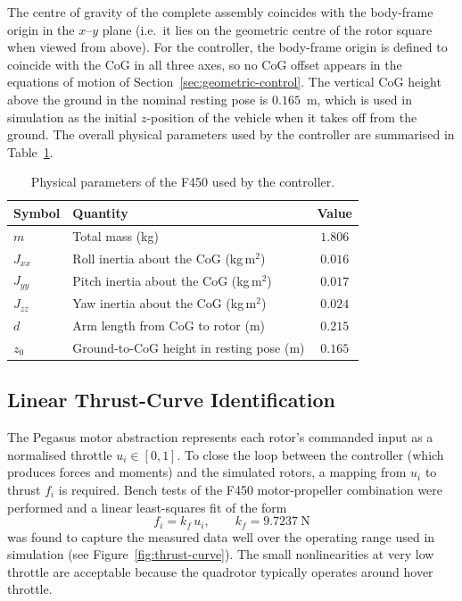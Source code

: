 \documentclass[11pt]{article}
\theoremstyle{remark}
\begin{document}
The centre of gravity of the complete assembly coincides with the body-frame origin in the $x$--$y$ plane (i.e.\ it lies on the geometric centre of the rotor square when viewed from above). For the controller, the body-frame origin is defined to coincide with the CoG in all three axes, so no CoG offset appears in the equations of motion of Section~\ref{sec:geometric-control}. The vertical CoG height above the ground in the nominal resting pose is $0.165$~m, which is used in simulation as the initial $z$-position of the vehicle when it takes off from the ground. The overall physical parameters used by the controller are summarised in Table~\ref{tab:phys-params}.

\begin{table}[H]
    \centering
    \caption{Physical parameters of the F450 used by the controller.}
    \label{tab:phys-params}
    \begin{tabular}{llc}
        \toprule
        Symbol & Quantity & Value \\
        \midrule
        $m$         & Total mass (kg)                                & $1.806$ \\
        $J_{xx}$    & Roll inertia about the CoG (kg\,m$^2$)         & $0.016$ \\
        $J_{yy}$    & Pitch inertia about the CoG (kg\,m$^2$)        & $0.017$ \\
        $J_{zz}$    & Yaw inertia about the CoG (kg\,m$^2$)          & $0.024$ \\
        $d$         & Arm length from CoG to rotor (m)               & $0.215$ \\
        $z_0$       & Ground-to-CoG height in resting pose (m)       & $0.165$ \\
        \bottomrule
    \end{tabular}
\end{table}

\subsection{Linear Thrust-Curve Identification}
\label{sec:thrust-curve}
The Pegasus motor abstraction represents each rotor's commanded input as a normalised throttle $u_i \in [0,1]$. To close the loop between the controller (which produces forces and moments) and the simulated rotors, a mapping from $u_i$ to thrust $f_i$ is required. Bench tests of the F450 motor-propeller combination were performed and a linear least-squares fit of the form
\begin{equation}
    f_i = k_f\, u_i, \qquad k_f = 9.7237~\mathrm{N}
    \label{eq:thrust-curve}
\end{equation}
was found to capture the measured data well over the operating range used in simulation (see Figure~\ref{fig:thrust-curve}). The small nonlinearities at very low throttle are acceptable because the quadrotor typically operates around hover throttle.
\end{document}
